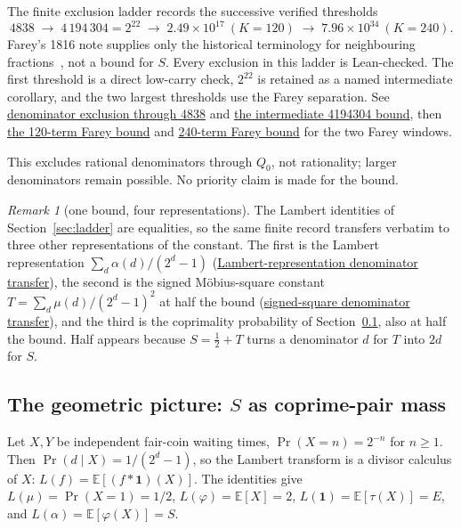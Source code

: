\documentclass[11pt]{article}
\newcommand{\commit}{312b96c0d149ed466725c62d4ef24cfc91bca34e}
\newcommand{\repobase}{https://github.com/wcook04/plectis-lean-erdos249-257/blob/\commit}
\newcommand{\PK}{Erdos249257}
\newcommand{\lword}[4]{\href{\repobase/\PK/#1\#L#2}{#4}}
\theoremstyle{definition}
\theoremstyle{remark}
\newtheorem*{remark}{Remark}
\newcommand{\ph}{\varphi}
\newcommand{\Qzero}{Q_0}
\begin{document}
The finite exclusion ladder records the successive verified thresholds
\[
4838 \;\to\; 4\,194\,304 = 2^{22} \;\to\; 2.49\times10^{17}\ (K{=}120)
\;\to\; 7.96\times10^{34}\ (K{=}240).
\]
Farey's 1816 note supplies only the historical terminology for neighbouring
fractions~\cite{farey1816}, not a bound for \(S\).  Every exclusion in this
ladder is Lean-checked.  The first threshold is a direct low-carry check,
$2^{22}$ is retained as a named intermediate corollary, and the two largest
thresholds use the Farey separation. See
\lword{CertificateKernel.lean}{15347}{tsum_totient_div_pow_two_ne_ratCast_of_den_le_4838}{denominator exclusion through 4838}
and \lword{CertificateKernel.lean}{18029}{tsum_totient_div_pow_two_ne_ratCast_of_den_le_4194304}{the intermediate 4194304 bound},
then \lword{GapFareyBound.lean}{88}{gap_check_window_1_120_le_248672326362367909}{the 120-term Farey bound} and
\lword{GapFareyBound.lean}{176}{gap_check_window_1_240_le_79639646646701375323355774875831053}{240-term Farey bound}
for the two Farey windows.

This excludes rational denominators through $\Qzero$, not rationality;
larger denominators remain possible.  No priority claim is made for the bound.

\begin{remark}[one bound, four representations]
The Lambert identities of Section~\ref{sec:ladder} are equalities, so the same
finite record transfers verbatim to three other representations of the constant.
The first is the Lambert representation $\sum_d \alpha(d)/(2^d-1)$
(\lword{CertificateKernel.lean}{18145}{tsum_primWeight_div_two_pow_sub_one_ne_int_div_of_den_le_79639646646701375323355774875831053}{Lambert-representation denominator transfer}),
the second is the signed M\"obius-square constant $T=\sum_d\mu(d)/(2^d-1)^2$ at half the bound
(\lword{CertificateKernel.lean}{18159}{tsum_moebius_div_two_pow_sub_one_sq_ne_int_div_of_den_le_39819823323350687661677887437915526}{signed-square denominator transfer}),
and the third is the coprimality probability of Section~\ref{sec:geom}, also at half the bound.
Half appears because $S=\tfrac12+T$ turns a denominator $d$ for $T$ into $2d$ for $S$.
\end{remark}

\subsection{The geometric picture: $S$ as coprime-pair mass}\label{sec:geom}

Let $X,Y$ be independent fair-coin waiting times, $\Pr(X=n)=2^{-n}$ for $n\ge1$.
Then $\Pr(d\mid X)=1/(2^d-1)$, so the Lambert transform is a divisor calculus of
$X$: $L(f)=\mathbb E[(f*\mathbf 1)(X)]$.  The identities give $L(\mu)=\Pr(X=1)=1/2$,
$L(\ph)=\mathbb E[X]=2$, $L(\mathbf 1)=\mathbb E[\tau(X)]=E$, and
$L(\alpha)=\mathbb E[\ph(X)]=S$.
\end{document}
